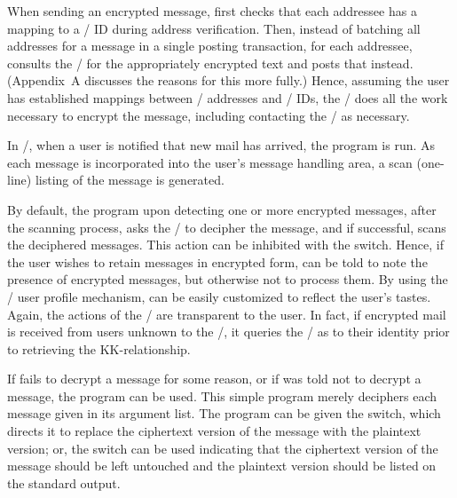When sending an encrypted message,
 first checks that each addressee has a mapping to a \KDS/ ID
during address verification.
Then, instead of batching all addresses for a message in a single posting
transaction,
for each addressee,
 consults the \TMA/ for the appropriately encrypted text and
posts that instead.
(Appendix~A discusses the reasons for this more fully.)
Hence,
assuming the user has established mappings between \MTS/ addresses
and \KDS/ IDs,
the \TMA/ does all the work necessary to encrypt the message,
including contacting the \KDS/ as necessary.%

In \MH/,
when a user is notified that new mail has arrived,
the  program is run.
As each message is incorporated into the user's message handling area,
a scan (one-line) listing of the message is generated.

By default,
the  program upon detecting one or more encrypted messages,
after the scanning process,
asks the \TMA/ to decipher the message,
and if successful,
scans the deciphered messages.
This action can be inhibited with the  switch.
Hence, if the user wishes to retain messages in encrypted form,
 can be told to note the presence of encrypted messages,
but otherwise not to process them.
By using the \MH/ user profile mechanism,
 can be easily customized to reflect the user's tastes.
Again,
the actions of the \TMA/ are transparent to the user.
In fact,
if encrypted mail is received from users unknown to the \TMA/,
it queries the \KDS/ as to their identity prior to retrieving the
KK-relationship.

If  fails to decrypt a message for some reason,
or if  was told not to decrypt a message,
the  program can be used.
This simple program merely deciphers each message given in its argument
list.
The  program can be given the  switch,
which directs it to replace the ciphertext version of the message with the
plaintext version;
or,
the  switch can be used indicating that the ciphertext
version of the message should be left untouched and the plaintext version
should be listed on the standard output.

